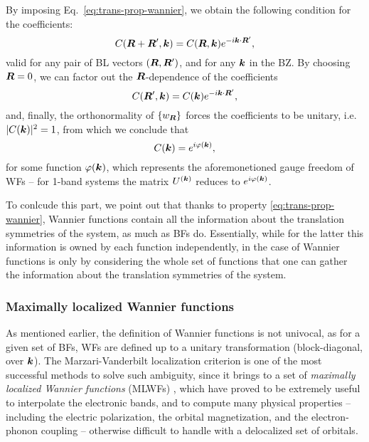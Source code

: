 %
By imposing Eq.~\eqref{eq:trans-prop-wannier}, we obtain the following condition for the coefficients:
%
\begin{equation}
    C({\bm R} + {\bm R}', {\bm k}) = C({\bm R}, {\bm k}) e^{-i{\bm k} \cdot {\bm R}'} ,
    \label{eq:crk-coefficents-trans-prop}
\end{equation}
%
valid for any pair of BL vectors $({\bm R},{\bm R}')$, and for any ${\bm k}$ in the BZ. By choosing ${\bm R}=0$, we can factor out the ${\bm R}$-dependence of the coefficients
%
\begin{equation}
    C({\bm R}',{\bm k}) = C({\bm k}) e^{-i{\bm k} \cdot {\bm R}'} ,
    \label{eq:crk-coefficients-factor-out}
\end{equation}
%
and, finally, the orthonormality of $\{ w_{{\bm R}} \}$ forces the coefficients to be unitary, i.e. $|C({\bm k})|^2=1$, from which we conclude that
\begin{equation}
    C({\bm k}) = e^{i\varphi({\bm k})} ,
\end{equation}
%
for some function $\varphi({\bm k})$, which represents the aforemonetioned gauge freedom of WFs -- for 1-band systems the matrix $U^{({\bm k})}$ reduces to $e^{i\varphi({\bm k})}$.

To conlcude this part, we point out that thanks to property \eqref{eq:trans-prop-wannier}, Wannier functions contain all the information about the translation symmetries of the system, as much as BFs do. Essentially, while for the latter this information is owned by each function independently, in the case of Wannier functions is only by considering the whole set of functions that one can gather the information about the translation symmetries of the system.

\subsubsection*{Maximally localized Wannier functions}
As mentioned earlier, the definition of Wannier functions is not univocal, as for a given set of BFs, WFs are defined up to a unitary transformation (block-diagonal, over ${\bm k}$). The Marzari-Vanderbilt localization criterion is one of the most successful methods to solve such ambiguity, since it brings to a set of \emph{maximally localized Wannier functions} (MLWFs) \cite{marzari_maximally_1997}, which have proved to be extremely useful to interpolate the electronic bands, and to compute many physical properties \cite{marzari_maximally_2012} -- including the electric polarization, the orbital magnetization, and the electron-phonon coupling -- otherwise difficult to handle with a delocalized set of orbitals.

